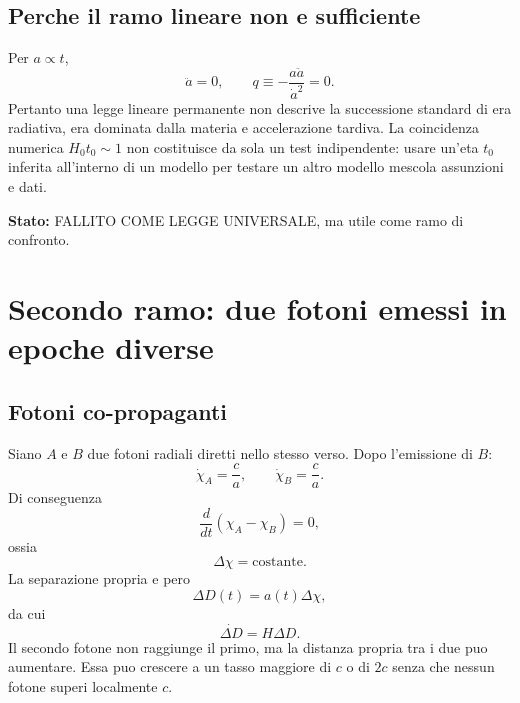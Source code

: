 \documentclass[11pt,a4paper]{article}
\newcommand{\status}[1]{\textsf{#1}}
\begin{document}
\subsection{Perche il ramo lineare non e sufficiente}

Per $a\propto t$,
\begin{equation}
 \ddot a=0,\qquad q\equiv-\frac{a\ddot a}{\dot a^2}=0.
\end{equation}
Pertanto una legge lineare permanente non descrive la successione standard di era radiativa, era dominata dalla materia e accelerazione tardiva. La coincidenza numerica $H_0t_0\sim1$ non costituisce da sola un test indipendente: usare un'eta $t_0$ inferita all'interno di un modello per testare un altro modello mescola assunzioni e dati.

\textbf{Stato:} \status{FALLITO COME LEGGE UNIVERSALE}, ma utile come ramo di confronto.

\section{Secondo ramo: due fotoni emessi in epoche diverse}

\subsection{Fotoni co-propaganti}

Siano $A$ e $B$ due fotoni radiali diretti nello stesso verso. Dopo l'emissione di $B$:
\begin{equation}
 \dot\chi_A=\frac{c}{a},\qquad \dot\chi_B=\frac{c}{a}.
\end{equation}
Di conseguenza
\begin{equation}
 \frac{d}{dt}(\chi_A-\chi_B)=0,
\end{equation}
ossia
\begin{equation}
 \boxed{\Delta\chi=\mathrm{costante}.}
 \label{eq:comoving_constant}
\end{equation}
La separazione propria e pero
\begin{equation}
 \Delta D(t)=a(t)\Delta\chi,
\end{equation}
da cui
\begin{equation}
 \boxed{\dot{\Delta D}=H\Delta D.}
 \label{eq:coprop_separation}
\end{equation}
Il secondo fotone non raggiunge il primo, ma la distanza propria tra i due puo aumentare. Essa puo crescere a un tasso maggiore di $c$ o di $2c$ senza che nessun fotone superi localmente $c$.
\end{document}
